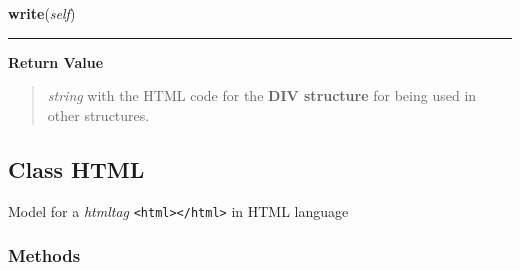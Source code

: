 \hspace{.8\funcindent}\begin{boxedminipage}{\funcwidth}

    \raggedright \textbf{write}(\textit{self})

    \vspace{-1.5ex}

    \rule{\textwidth}{0.5\fboxrule}
\setlength{\parskip}{2ex}
\setlength{\parskip}{1ex}
      \textbf{Return Value}
    \vspace{-1ex}

      \begin{quote}

\emph{string} with the HTML code for the \textbf{DIV structure} for being used in other structures.
      \end{quote}

    \end{boxedminipage}



\subsection{Class HTML}

    \label{module_Web:HTML}

Model for a \emph{htmltag} \texttt{<html></html>} in HTML language


  \subsubsection{Methods}

    \label{module_Web:HTML:__init__}

    \vspace{0.5ex}

